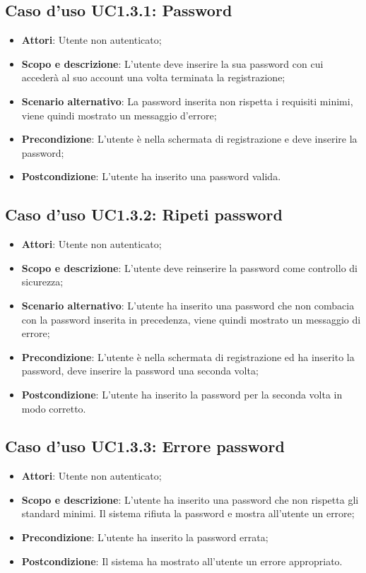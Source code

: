 \documentclass[12pt,a4paper,titlepage]{article}
\begin{document}
	\subsection{Caso d'uso UC1.3.1: Password}
	\label{UC1.3.1}
	\begin{itemize}
		\item \textbf{Attori}: Utente non autenticato;
		\item \textbf{Scopo e descrizione}: L'utente deve inserire la sua password con cui accederà al suo account una volta terminata la registrazione;
		\item \textbf{Scenario alternativo}: La password inserita non rispetta i requisiti minimi, viene quindi mostrato un messaggio d'errore;
		\item \textbf{Precondizione}: L'utente è nella schermata di registrazione e deve inserire la password;
		\item \textbf{Postcondizione}: L'utente ha inserito una password valida.
	\end{itemize}
	\subsection{Caso d'uso UC1.3.2: Ripeti password}
	\label{UC1.3.2}
	\begin{itemize}
		\item \textbf{Attori}: Utente non autenticato;
		\item \textbf{Scopo e descrizione}: L'utente deve reinserire la password come controllo di sicurezza;
		\item \textbf{Scenario alternativo}: L'utente ha inserito una password che non combacia con la password inserita in precedenza, viene quindi mostrato un messaggio di errore;
		\item \textbf{Precondizione}: L'utente è nella schermata di registrazione ed ha inserito la password, deve inserire la password una seconda volta;
		\item \textbf{Postcondizione}: L'utente ha inserito la password per la seconda volta in modo corretto.
	\end{itemize}
	\subsection{Caso d'uso UC1.3.3: Errore password}
	\label{UC1.3.3}
	\begin{itemize}
		\item \textbf{Attori}: Utente non autenticato;
		\item \textbf{Scopo e descrizione}: L'utente ha inserito una password che non rispetta gli standard minimi. Il sistema rifiuta la password e mostra all'utente un errore;
		\item \textbf{Precondizione}: L'utente ha inserito la password errata;
		\item \textbf{Postcondizione}: Il sistema ha mostrato all'utente un errore appropriato.
	\end{itemize}
\end{document}
